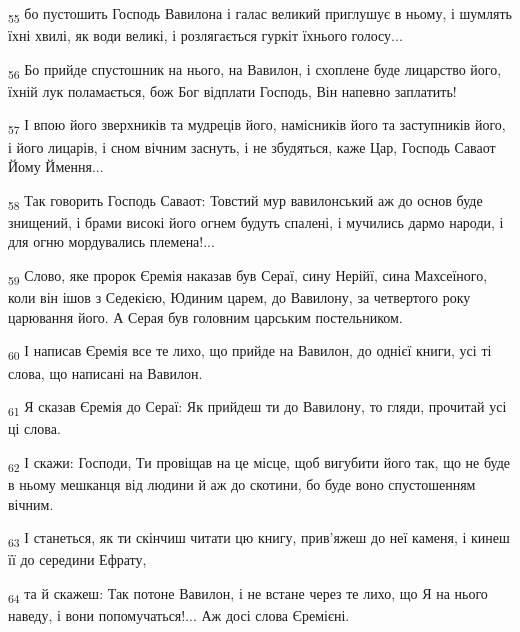 \begin{tcolorbox}
\textsubscript{55} бо пустошить Господь Вавилона і галас великий приглушує в ньому, і шумлять їхні хвилі, як води великі, і розлягається гуркіт їхнього голосу...
\end{tcolorbox}
\begin{tcolorbox}
\textsubscript{56} Бо прийде спустошник на нього, на Вавилон, і схоплене буде лицарство його, їхній лук поламається, бож Бог відплати Господь, Він напевно заплатить!
\end{tcolorbox}
\begin{tcolorbox}
\textsubscript{57} І впою його зверхників та мудреців його, намісників його та заступників його, і його лицарів, і сном вічним заснуть, і не збудяться, каже Цар, Господь Саваот Йому Ймення...
\end{tcolorbox}
\begin{tcolorbox}
\textsubscript{58} Так говорить Господь Саваот: Товстий мур вавилонський аж до основ буде знищений, і брами високі його огнем будуть спалені, і мучились дармо народи, і для огню мордувались племена!...
\end{tcolorbox}
\begin{tcolorbox}
\textsubscript{59} Слово, яке пророк Єремія наказав був Сераї, сину Нерійї, сина Махсеїного, коли він ішов з Седекією, Юдиним царем, до Вавилону, за четвертого року царювання його. А Серая був головним царським постельником.
\end{tcolorbox}
\begin{tcolorbox}
\textsubscript{60} І написав Єремія все те лихо, що прийде на Вавилон, до однієї книги, усі ті слова, що написані на Вавилон.
\end{tcolorbox}
\begin{tcolorbox}
\textsubscript{61} Я сказав Єремія до Сераї: Як прийдеш ти до Вавилону, то гляди, прочитай усі ці слова.
\end{tcolorbox}
\begin{tcolorbox}
\textsubscript{62} І скажи: Господи, Ти провіщав на це місце, щоб вигубити його так, що не буде в ньому мешканця від людини й аж до скотини, бо буде воно спустошенням вічним.
\end{tcolorbox}
\begin{tcolorbox}
\textsubscript{63} І станеться, як ти скінчиш читати цю книгу, прив'яжеш до неї каменя, і кинеш її до середини Ефрату,
\end{tcolorbox}
\begin{tcolorbox}
\textsubscript{64} та й скажеш: Так потоне Вавилон, і не встане через те лихо, що Я на нього наведу, і вони попомучаться!... Аж досі слова Єремієні.
\end{tcolorbox}
